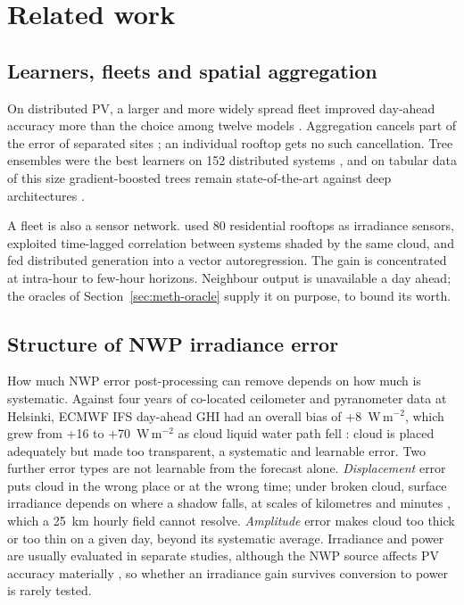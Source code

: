 \section{Related work}
\label{sec:related}

\subsection{Learners, fleets and spatial aggregation}
\label{sec:rw-learners}

On distributed PV, a larger and more widely spread fleet improved day-ahead accuracy more than the choice among twelve models \citep{Visser2022}. Aggregation cancels part of the error of separated sites \citep{Aldeman2023}; an individual rooftop gets no such cancellation. Tree ensembles were the best learners on 152 distributed systems \citep{Visser2019}, and on tabular data of this size gradient-boosted trees remain state-of-the-art against deep architectures \citep{Grinsztajn2022}.

A fleet is also a sensor network. \citet{Lonij2013} used 80 residential rooftops as irradiance sensors, \citet{Elsinga2017} exploited time-lagged correlation between systems shaded by the same cloud, and \citet{Bessa2015} fed distributed generation into a vector autoregression. The gain is concentrated at intra-hour to few-hour horizons. Neighbour output is unavailable a day ahead; the oracles of Section~\ref{sec:meth-oracle} supply it on purpose, to bound its worth.

\subsection{Structure of NWP irradiance error}
\label{sec:rw-nwp}

How much NWP error post-processing can remove depends on how much is systematic. Against four years of co-located ceilometer and pyranometer data at Helsinki, ECMWF IFS day-ahead GHI had an overall bias of +8~W\,m$^{-2}$, which grew from +16 to +70~W\,m$^{-2}$ as cloud liquid water path fell \citep{Tuononen2019}: cloud is placed adequately but made too transparent, a systematic and learnable error. Two further error types are not learnable from the forecast alone. \emph{Displacement} error puts cloud in the wrong place or at the wrong time; under broken cloud, surface irradiance depends on where a shadow falls, at scales of kilometres and minutes \citep{Mol2024}, which a 25~km hourly field cannot resolve. \emph{Amplitude} error makes cloud too thick or too thin on a given day, beyond its systematic average. Irradiance and power are usually evaluated in separate studies, although the NWP source affects PV accuracy materially \citep{Mayer2023}, so whether an irradiance gain survives conversion to power is rarely tested.

